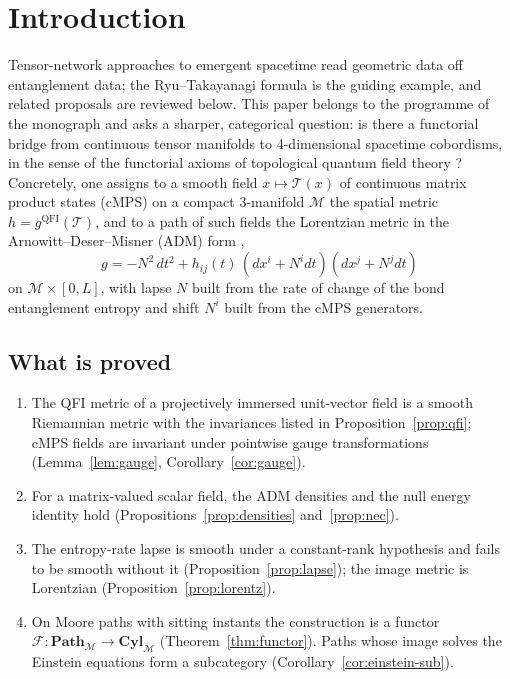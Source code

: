 \documentclass[11pt,a4paper,reqno]{amsart}
\theoremstyle{definition}
\numberwithin{equation}{section}
\newcommand{\QFI}{\mathrm{QFI}}
\newcommand{\Path}{\mathbf{Path}_{\mathcal{M}}}
\newcommand{\Cyl}{\mathbf{Cyl}_{\mathcal{M}}}
\begin{document}
\tableofcontents

\section{Introduction}
\label{sec:intro}

Tensor-network approaches to emergent spacetime read geometric data off entanglement data; the Ryu--Takayanagi formula \cite{ryu2006holographic} is the guiding example, and related proposals are reviewed below. This paper belongs to the programme of the monograph \cite{silvafilho2026book} and asks a sharper, categorical question: is there a functorial bridge from continuous tensor manifolds to 4-dimensional spacetime cobordisms, in the sense of the functorial axioms of topological quantum field theory \cite{atiyah1988topological}? Concretely, one assigns to a smooth field $x\mapsto\mathcal{T}(x)$ of continuous matrix product states (cMPS) \cite{verstraete2010continuous,haegeman2013calculus} on a compact 3-manifold $\mathcal{M}$ the spatial metric $h=g^{\QFI}(\mathcal{T})$, and to a path of such fields the Lorentzian metric in the Arnowitt--Deser--Misner (ADM) form \cite[Sec.~3]{adm2008},~\cite[Ch.~4]{gourgoulhon2012}
\begin{equation}\label{eq:adm}
    g=-N^2\,dt^2+h_{ij}(t)\,(dx^i+N^i dt)(dx^j+N^j dt)
\end{equation}
on $\mathcal{M}\times[0,L]$, with lapse $N$ built from the rate of change of the bond entanglement entropy and shift $N^i$ built from the cMPS generators.

\subsection*{What is proved}
\begin{enumerate}[label=(\roman*)]
    \item The QFI metric of a projectively immersed unit-vector field is a smooth Riemannian metric with the invariances listed in Proposition~\ref{prop:qfi}; cMPS fields are invariant under pointwise gauge transformations (Lemma~\ref{lem:gauge}, Corollary~\ref{cor:gauge}).
    \item For a matrix-valued scalar field, the ADM densities and the null energy identity hold (Propositions~\ref{prop:densities} and~\ref{prop:nec}).
    \item The entropy-rate lapse is smooth under a constant-rank hypothesis and fails to be smooth without it (Proposition~\ref{prop:lapse}); the image metric is Lorentzian (Proposition~\ref{prop:lorentz}).
    \item On Moore paths with sitting instants the construction is a functor $\mathcal{F}:\Path\to\Cyl$ (Theorem~\ref{thm:functor}). Paths whose image solves the Einstein equations form a subcategory (Corollary~\ref{cor:einstein-sub}).
\end{enumerate}
\end{document}
